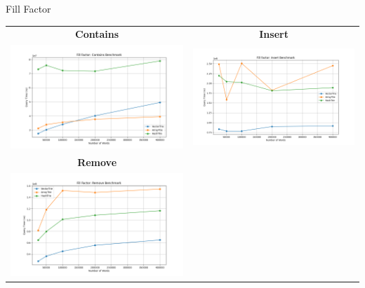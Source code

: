 \documentclass{beamer}
\begin{document}
    \begin{frame}{Fill Factor}
        \begin{center}
            \begin{tabular}{cc}
                \textbf{Contains}                                                                & \textbf{Insert} \\
                \includegraphics[width=0.45\linewidth]{plot_fill_factor/plot_fill_factor_contains} &
                \includegraphics[width=0.45\linewidth]{plot_fill_factor/plot_fill_factor_insert} \\
                \textbf{Remove}                                                                  &                 \\
                \includegraphics[width=0.45\linewidth]{plot_fill_factor/plot_fill_factor_remove}& \\
            \end{tabular}
        \end{center}
    \end{frame}

\end{document}
